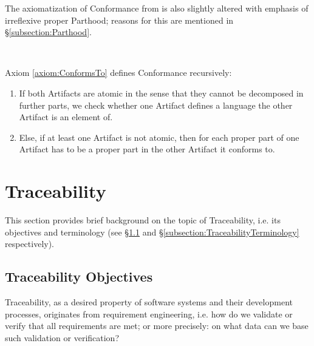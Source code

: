 The axiomatization of \gls{Conformance} from \cite{DBLP:conf/modelsward/HeinzLV17} is also slightly altered with emphasis of irreflexive proper \gls{Parthood}; reasons for this are mentioned in §\ref{subsection:Parthood}.
\begin{axiom}[\conformsTo]
\label{axiom:ConformsTo}
~\newline
{}
\end{axiom}
Axiom \ref{axiom:ConformsTo} defines \gls{Conformance} recursively:
\begin{enumerate}[align=left,label=\textbf{Case \Roman*},ref={\Roman*}]
\item
If both \glspl{Artifact} are atomic in the sense that they cannot be decomposed in further parts, we check whether one \gls{Artifact} defines a language the other \gls{Artifact} is an element of.

\item
Else, if at least one \gls{Artifact} is not atomic, then for each proper part of one \gls{Artifact} has to be a proper part in the other \gls{Artifact} it conforms to.
\end{enumerate}


\section{Traceability}
\label{section:Traceability}
This section provides brief background on the topic of \gls{Traceability}, i.e. its objectives and terminology (see §\ref{subsection:TraceabilityObjectives} and §\ref{subsection:TraceabilityTerminology} respectively).

\subsection{Traceability Objectives}
\label{subsection:TraceabilityObjectives}
\Gls{Traceability}, as a desired property of software systems and their development processes, originates from requirement engineering, i.e.
how do we validate or verify that all requirements are met;
or more precisely: on what data can we base such validation or verification?
\cite{DBLP:journals/sosym/WinklerP10}

